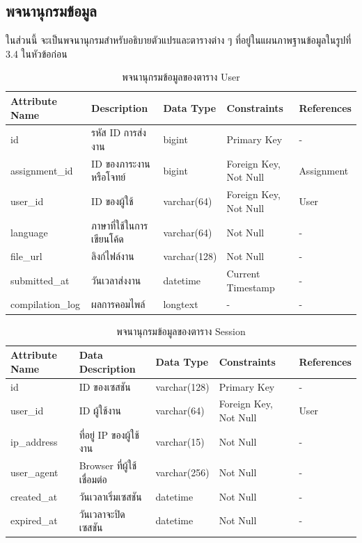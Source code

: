\documentclass[12pt,oneside,openright,a4paper]{cpe-thai-project}
\begin{document}
    \subsection{พจนานุกรมข้อมูล}
    ในส่วนนี้ จะเป็นพจนานุกรมสำหรับอธิบายตัวแปรและตารางต่าง ๆ ที่อยู่ในแผนภาพฐานข้อมูลในรูปที่ 3.4 ในหัวข้อก่อน
    \begin{table}[!h]
        \centering
        \caption{พจนานุกรมข้อมูลของตาราง User}\label{tbl:data-dict-user}
        \begin{tabular}{p{2cm}|p{4cm}p{2cm}p{3cm}p{2cm}} \hline\hline
            Attribute Name & Description & Data Type & Constraints & References \\ \hline\hline
            id & รหัส ID การส่งงาน & bigint & Primary Key & - \\
            assignment\_id & ID ของภาระงานหรือโจทย์ & bigint & Foreign Key, Not Null & Assignment \\
            user\_id & ID ของผู้ใช้ & varchar(64) & Foreign Key, Not Null & User \\
            language & ภาษาที่ใช้ในการเขียนโค้ด & varchar(64) & Not Null & - \\
            file\_url & ลิงก์ไฟล์งาน & varchar(128) & Not Null & - \\
            submitted\_at & วันเวลาส่งงาน & datetime & Current Timestamp & - \\
            compilation\_log & ผลการคอมไพล์ & longtext & - & - \\ \hline\hline
        \end{tabular}   
    \end{table}

    \begin{table}[!h]
        \centering
        \caption{พจนานุกรมข้อมูลของตาราง Session}\label{tbl:data-dict-session}
        \begin{tabular}{p{2cm}|p{4cm}p{2cm}p{3cm}p{2cm}} \hline\hline
            Attribute Name & Data Description & Data Type & Constraints & References \\ \hline\hline
            id & ID ของเซสชัน & varchar(128) & Primary Key & - \\
            user\_id & ID ผู้ใช้งาน & varchar(64) & Foreign Key, Not Null & User \\
            ip\_address & ที่อยู่ IP ของผู้ใช้งาน & varchar(15) & Not Null & - \\
            user\_agent & Browser ที่ผู้ใช้เชื่อมต่อ & varchar(256) & Not Null & - \\
            created\_at & วันเวลาเริ่มเซสชัน & datetime & Not Null & - \\
            expired\_at & วันเวลาจะปิดเซสชัน & datetime & Not Null & - \\ \hline\hline
        \end{tabular}   
    \end{table}
\end{document}

